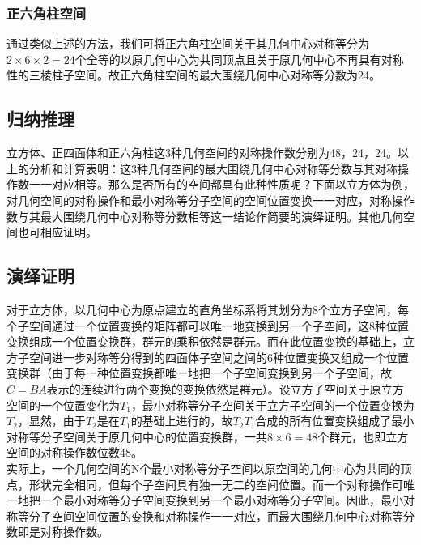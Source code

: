 \documentclass{style}
\begin{document}
\subsubsection{正六角柱空间} %
\label{sub:c_正六角柱空间}
通过类似上述的方法，我们可将正六角柱空间关于其几何中心对称等分为$2\times6\times2=24$个全等的以原几何中心为共同顶点且关于原几何中心不再具有对称性的三棱柱子空间。故正六角柱空间的最大围绕几何中心对称等分数为24。

\subsection{归纳推理} %
\label{sub:归纳推理}
立方体、正四面体和正六角柱这3种几何空间的对称操作数分别为48，24，24。以上的分析和计算表明：这3种几何空间的最大围绕几何中心对称等分数与其对称操作数一一对应相等。那么是否所有的空间都具有此种性质呢？下面以立方体为例，对几何空间的对称操作和最小对称等分子空间的空间位置变换一一对应，对称操作数与其最大围绕几何中心对称等分数相等这一结论作简要的演绎证明。其他几何空间也可相应证明。

\subsection{演绎证明} %
\label{sub:演绎证明}
对于立方体，以几何中心为原点建立的直角坐标系将其划分为8个立方子空间，每个子空间通过一个位置变换的矩阵都可以唯一地变换到另一个子空间，这8种位置变换组成一个位置变换群，群元的乘积依然是群元。而在此位置变换的基础上，立方子空间进一步对称等分得到的四面体子空间之间的6种位置变换又组成一个位置变换群（由于每一种位置变换都唯一地把一个子空间变换到另一个子空间，故$C=BA$表示的连续进行两个变换的变换依然是群元）。设立方子空间关于原立方空间的一个位置变化为$T_1$，最小对称等分子空间关于立方子空间的一个位置变换为$T_2$，显然，由于$T_2$是在$T_1$的基础上进行的，故$T_2T_1$合成的所有位置变换组成了最小对称等分子空间关于原几何中心的位置变换群，一共$8\times6=48$个群元，也即立方空间的对称操作数位数48。\\

实际上，一个几何空间的N个最小对称等分子空间以原空间的几何中心为共同的顶点，形状完全相同，但每个子空间具有独一无二的空间位置。而一个对称操作可唯一地把一个最小对称等分子空间变换到另一个最小对称等分子空间。因此，最小对称等分子空间空间位置的变换和对称操作一一对应，而最大围绕几何中心对称等分数即是对称操作数。
\end{document}
